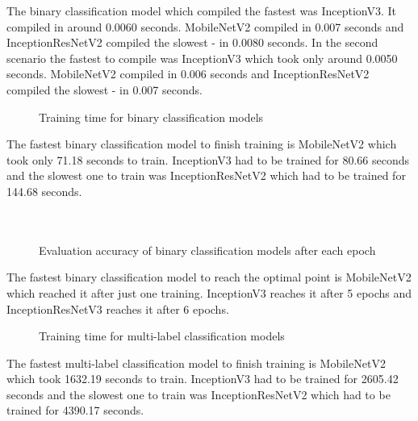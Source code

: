 \documentclass{ijisa}
\begin{document}
The binary classification model which compiled the fastest was InceptionV3. It compiled in around 0.0060 seconds. MobileNetV2 compiled in 0.007 seconds and InceptionResNetV2 compiled the slowest - in 0.0080 seconds. In the second scenario the fastest to compile was InceptionV3 which took only around 0.0050 seconds. MobileNetV2 compiled in 0.006 seconds and InceptionResNetV2 compiled the slowest - in 0.007 seconds.


\begin{figure}[!h]
\centering
\scalebox{0.5}{}
\caption{Training time for binary classification models} \label{fig:fig6}
\end{figure}

The fastest binary classification model to finish training is MobileNetV2 which took only 71.18 seconds to train. InceptionV3 had to be trained for 80.66 seconds and the slowest one to train was InceptionResNetV2 which had to be trained for 144.68 seconds.\\\\\\

\begin{figure}[!h]
\centering
\scalebox{0.5}{}
\caption{Evaluation accuracy of binary classification models after each epoch} \label{fig:fig8}
\end{figure}

The fastest binary classification model to reach the optimal point is MobileNetV2 which reached it after just one training. InceptionV3 reaches it after 5 epochs and InceptionResNetV3 reaches it after 6 epochs.

\begin{figure}[!h]
\centering
\scalebox{0.5}{}
\caption{Training time for multi-label classification models} \label{fig:fig9}
\end{figure}

The fastest multi-label classification model to finish training is MobileNetV2 which took 1632.19 seconds to train. InceptionV3 had to be trained for 2605.42 seconds and the slowest one to train was InceptionResNetV2 which had to be trained for 4390.17 seconds.\\\\\\\\\\\\\\
\end{document}

